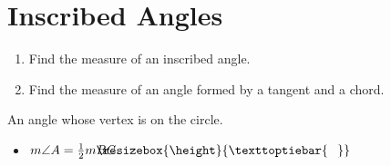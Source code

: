 \documentclass{article}
\newcommand{\arc}[1]{%
    \setbox9=\hbox{#1}%
    \ooalign{\resizebox{\wd9}{\height}{\texttoptiebar{\phantom{A}}}\cr#1}}
\begin{document}
\section*{Inscribed Angles}

\begin{tcolorbox}[colframe=orange!70!white, coltitle=black, title=\textbf{Today I Can}]
\begin{enumerate}
    \item Find the measure of an inscribed angle.
    \item Find the measure of an angle formed by a tangent and a chord.
\end{enumerate}
\end{tcolorbox}
\smallskip 

\begin{tcolorbox}[colframe=black!20!white, opacitybacktitle=0.1, coltitle=black, title=\textbf{Inscribed Angle}]
An angle whose vertex is on the circle. \newline

\begin{minipage}{0.5\textwidth}
\begin{itemize}
    \item $m\angle A = \frac{1}{2} m \arc{\textit{BC}}$
\end{itemize}
\end{minipage}
\begin{minipage}{0.3\textwidth}
\end{minipage}
\end{tcolorbox}
\smallskip 
\end{document}
